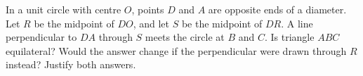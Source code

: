 In a unit circle with centre $O$, points $D$ and $A$ are opposite ends of a diameter. Let $R$ be the midpoint of $DO$, and let $S$ be the midpoint of $DR$. A line perpendicular to $DA$ through $S$ meets the circle at $B$ and $C$. Is triangle $ABC$ equilateral? Would the answer change if the perpendicular were drawn through $R$ instead? Justify both answers.
